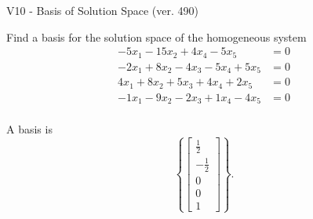 \begin{exercise}
  \begin{exerciseTitle}V10 - Basis of Solution Space (ver. 490)\end{exerciseTitle}
  \begin{exerciseStatement}
    Find a basis for the solution space of the homogeneous system 
\begin{align*}
 -5 x_ 1 -15 x_ 2 + 4 x_ 4 -5 x_ 5 &= 0  \\ 
  -2 x_ 1 + 8 x_ 2 -4 x_ 3 -5 x_ 4 + 5 x_ 5 &= 0  \\ 
  4 x_ 1 + 8 x_ 2 + 5 x_ 3 + 4 x_ 4 + 2 x_ 5 &= 0  \\ 
  -1 x_ 1 -9 x_ 2 -2 x_ 3 + 1 x_ 4 -4 x_ 5 &= 0  \\ 
 \end{align*}


 
  \end{exerciseStatement}

  \begin{exerciseAnswer}
   A basis is   
\[\left\{\left[\begin{array}{c}
\frac{1}{2} \\
-\frac{1}{2} \\
0 \\
0 \\
1
\end{array}\right]\right\}.\]

  


  \end{exerciseAnswer}
\end{exercise}
